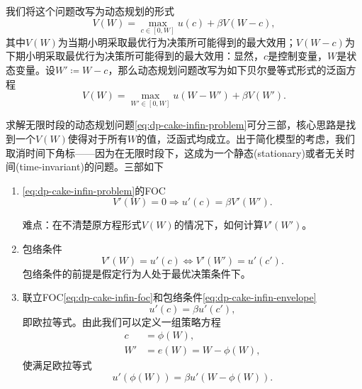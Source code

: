 我们将这个问题改写为动态规划的形式
\begin{equation*}
  V \left( W \right) = \max_{c \in \left[ 0, W \right]} u(c) + \beta V \left( W - c \right),
\end{equation*}
其中$V \left( W \right)$为当期小明采取最优行为决策所可能得到的最大效用；$V \left( W - c \right)$为下期小明采取最优行为决策所可能得到的最大效用：显然，$c$是控制变量，$W$是状态变量。设$W' \coloneqq W-c$，那么动态规划问题改写为如下贝尔曼等式形式的泛函方程
\begin{equation}
  \label{eq:dp-cake-infin-problem}
  V \left( W \right) = \max_{W' \in \left[ 0, W \right]} u \left( W - W' \right) + \beta V \left( W' \right).
\end{equation}


求解无限时段的动态规划问题\eqref{eq:dp-cake-infin-problem}可分三部，核心思路是找到一个$V \left( W \right)$使得对于所有$W$的值，泛函式均成立。出于简化模型的考虑，我们取消时间下角标——因为在无限时段下，这成为一个静态(stationary)或者无关时间(time-invariant)的问题。三部如下
\begin{enumerate}
  \item \eqref{eq:dp-cake-infin-problem}的FOC
  \begin{equation}
    \label{eq:dp-cake-infin-foc}
    V' \left(W \right) = 0 \Rightarrow u'(c) = \beta V' \left( W' \right).
  \end{equation}

  难点：在不清楚原方程形式$V(W)$的情况下，如何计算$V'(W')$。

  \item 包络条件
  \begin{equation}
    \label{eq:dp-cake-infin-envelope}
    V'\left( W \right) = u'(c) \Leftrightarrow V'(W') = u'(c').
  \end{equation}
  包络条件的前提是假定行为人处于最优决策条件下。

  \item 联立FOC\eqref{eq:dp-cake-infin-foc}和包络条件\eqref{eq:dp-cake-infin-envelope}
  \begin{equation}
    u'(c) = \beta u'(c'),
  \end{equation}
  即欧拉等式。由此我们可以定义一组策略方程
  \begin{equation}
    \label{eq:dp-cake-infin-envelope-policies}
    \begin{split}
      c & = \phi \left(W \right), \\
      W' & = e \left(W \right) = W - \phi \left( W \right),
    \end{split}
  \end{equation}
使满足欧拉等式
\begin{equation}
  \label{eq:dp-cake-infin-envelope-euler}
  u' \left( \phi (W) \right) = \beta u'
  \left(
  W - \phi (W)
  \right).
\end{equation}
\end{enumerate}

